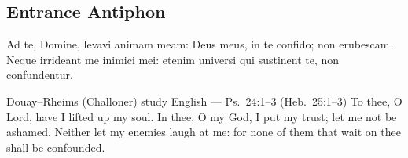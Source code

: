 \subsection{Entrance Antiphon}\label{proper-entrance-antiphon}
\begin{latinproper}
 Ad te, Domine, levavi animam meam: Deus meus, in te confido; non erubescam. Neque irrideant me inimici mei: etenim universi qui sustinent te, non confundentur.
\end{latinproper}
\begin{englishwitness}{Douay--Rheims (Challoner) study English --- Ps.~24:1--3 (Heb.~25:1--3)}
 To thee, O Lord, have I lifted up my soul. In thee, O my God, I put my trust; let me not be ashamed. Neither let my enemies laugh at me: for none of them that wait on thee shall be confounded.
\end{englishwitness}

